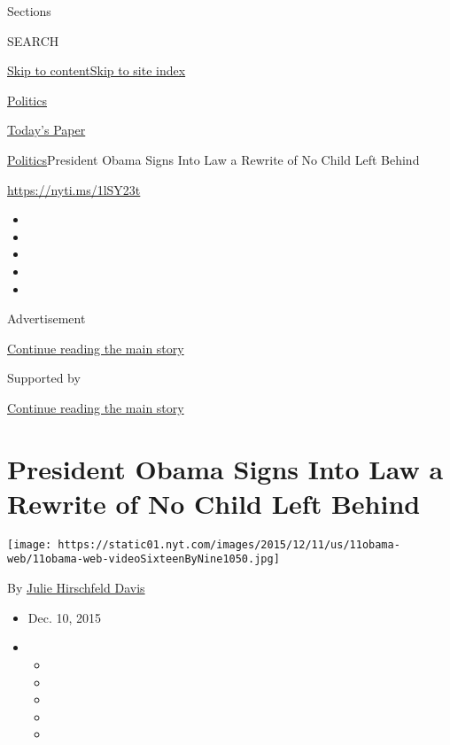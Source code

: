 Sections

SEARCH

\protect\hyperlink{site-content}{Skip to
content}\protect\hyperlink{site-index}{Skip to site index}

\href{https://www.nytimes.com/section/politics}{Politics}

\href{https://myaccount.nytimes.com/auth/login?response_type=cookie\&client_id=vi}{}

\href{https://www.nytimes.com/section/todayspaper}{Today's Paper}

\href{/section/politics}{Politics}\textbar{}President Obama Signs Into
Law a Rewrite of No Child Left Behind

\url{https://nyti.ms/1lSY23t}

\begin{itemize}
\item
\item
\item
\item
\item
\end{itemize}

Advertisement

\protect\hyperlink{after-top}{Continue reading the main story}

Supported by

\protect\hyperlink{after-sponsor}{Continue reading the main story}

\hypertarget{president-obama-signs-into-law-a-rewrite-of-no-child-left-behind}{%
\section{President Obama Signs Into Law a Rewrite of No Child Left
Behind}\label{president-obama-signs-into-law-a-rewrite-of-no-child-left-behind}}

\texttt{[image: https://static01.nyt.com/images/2015/12/11/us/11obama-web/11obama-web-videoSixteenByNine1050.jpg]}

By \href{https://www.nytimes.com/by/julie-hirschfeld-davis}{Julie
Hirschfeld Davis}

\begin{itemize}
\item
  Dec. 10, 2015
\item
  \begin{itemize}
  \item
  \item
  \item
  \item
  \item
  \end{itemize}
\end{itemize}

